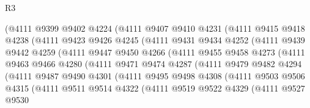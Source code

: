 \begin{lexlean}{R3}
\begin{coremodule}
                (@4111
                  @9399
                  @9402
                  @4224
                  (@4111
                    @9407
                    @9410
                    @4231
                    (@4111
                      @9415
                      @9418
                      @4238
                      (@4111
                        @9423
                        @9426
                        @4245
                        (@4111
                          @9431
                          @9434
                          @4252
                          (@4111
                            @9439
                            @9442
                            @4259
                            (@4111
                              @9447
                              @9450
                              @4266
                              (@4111
                                @9455
                                @9458
                                @4273
                                (@4111
                                  @9463
                                  @9466
                                  @4280
                                  (@4111
                                    @9471
                                    @9474
                                    @4287
                                    (@4111
                                      @9479
                                      @9482
                                      @4294
                                      (@4111
                                        @9487
                                        @9490
                                        @4301
                                        (@4111
                                          @9495
                                          @9498
                                          @4308
                                          (@4111
                                            @9503
                                            @9506
                                            @4315
                                            (@4111
                                              @9511
                                              @9514
                                              @4322
                                              (@4111
                                                @9519
                                                @9522
                                                @4329
                                                (@4111
                                                  @9527
                                                  @9530

\end{coremodule}
\end{lexlean}
